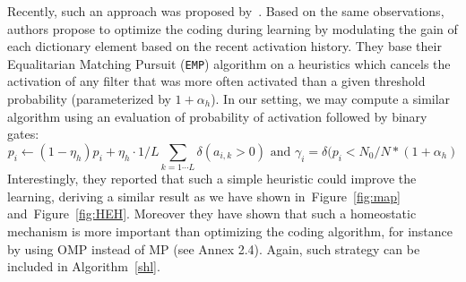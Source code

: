 \documentclass[draft]{article} %
\newcommand{\seeFig}[1]{Figure~\ref{fig:#1}}%
\begin{document}
Recently, such an approach was proposed by~\citet{Sandin17}. Based on the same observations, authors propose to optimize the coding during learning by modulating the gain of each dictionary element based on the recent activation history. They base their Equalitarian Matching Pursuit (\texttt{EMP}) algorithm on a heuristics which cancels the activation of any filter that was more often activated than a given threshold probability (parameterized by $1+\alpha_h$). In our setting, we may compute a similar algorithm using an evaluation of probability of activation followed by binary gates:
\begin{equation}%
p_i \leftarrow (1- \eta_h ) p_i + \eta_h \cdot 1/L\sum_{k=1\cdots L} \delta(a_{i, k} > 0) \textrm{ and }
\gamma_i = \delta (p_i < N_0/N*(1+\alpha_h)
\end{equation}%
Interestingly, they reported that such a simple heuristic could improve the learning, deriving a similar result as we have shown in~\seeFig{map} and~\seeFig{HEH}. Moreover they have shown that such a homeostatic mechanism is more important than optimizing the coding algorithm, for instance by using OMP instead of MP (see Annex 2.4). Again, such strategy can be included in Algorithm~\ref{shl}.
\end{document}
